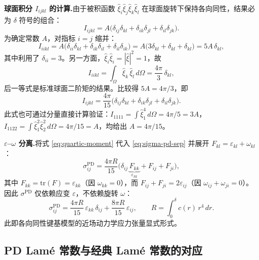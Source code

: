 \textbf{球面积分 $I_{ijkl}$ 的计算.}\quad 由于被积函数 $\hat{\xi}_i\hat{\xi}_j\hat{\xi}_k\hat{\xi}_l$ 在球面旋转下保持各向同性，结果必为 $\delta$ 符号的组合：
\begin{equation}
\label{eq:iso-tensor-form}
I_{ijkl} = A\bigl(\delta_{ij}\delta_{kl}+\delta_{ik}\delta_{jl}+\delta_{il}\delta_{jk}\bigr).
\end{equation}
为确定常数 $A$，对指标 $i=j$ 缩并：
\begin{equation}
\label{eq:contraction}
I_{iikl} = A\bigl(\delta_{ii}\delta_{kl}+\delta_{ik}\delta_{il}+\delta_{il}\delta_{ik}\bigr) = A\bigl(3\delta_{kl}+\delta_{kl}+\delta_{kl}\bigr) = 5A\,\delta_{kl},
\end{equation}
其中利用了 $\delta_{ii}=3$。另一方面，$\hat{\xi}_i\hat{\xi}_i=|\hat{\xi}|^2=1$，故
\begin{equation}
\label{eq:contraction-direct}
I_{iikl} = \int_\Omega \hat{\xi}_k\,\hat{\xi}_l\,d\Omega = \frac{4\pi}{3}\,\delta_{kl},
\end{equation}
后一等式是标准球面二阶矩的结果。比较得 $5A=4\pi/3$，即
\begin{equation}
\label{eq:quartic-moment}
\boxed{I_{ijkl} = \frac{4\pi}{15}\bigl(\delta_{ij}\delta_{kl}+\delta_{ik}\delta_{jl}+\delta_{il}\delta_{jk}\bigr).}
\end{equation}
此式也可通过分量直接计算验证：$I_{1111}=\int\hat{\xi}_1^4\,d\Omega=4\pi/5=3A$，$I_{1122}=\int\hat{\xi}_1^2\hat{\xi}_2^2\,d\Omega=4\pi/15=A$，均给出 $A=4\pi/15$。

\textbf{$\varepsilon$--$\omega$ 分离.}\quad 将式 \eqref{eq:quartic-moment} 代入 \eqref{eq:sigma-pd-sep} 并展开 $F_{kl}=\varepsilon_{kl}+\omega_{kl}$：
\begin{equation}
\label{eq:sigma-pd-expand}
\sigma^{\mathrm{PD}}_{ij} = \frac{4\pi R}{15}\bigl(\delta_{ij}\,\underbrace{F_{kk}}_{\varepsilon_{kk}} + F_{ij} + F_{ji}\bigr),
\end{equation}
其中 $F_{kk}=\mathrm{tr}(F)=\varepsilon_{kk}$（因 $\omega_{kk}=0$），而 $F_{ij}+F_{ji}=2\varepsilon_{ij}$（因 $\omega_{ij}+\omega_{ji}=0$）。因此 $\sigma^{\mathrm{PD}}$ 仅依赖应变 $\varepsilon$，不依赖旋转 $\omega$：
\begin{equation}
\label{eq:sigma-pd-explicit}
\boxed{\sigma^{\mathrm{PD}}_{ij} = \frac{4\pi R}{15}\,\varepsilon_{kk}\,\delta_{ij} + \frac{8\pi R}{15}\,\varepsilon_{ij},\qquad R=\int_0^\delta c(r)\,r^4\,dr.}
\end{equation}
此即各向同性键基模型的近场动力学应力张量显式形式。

\subsection{PD Lam\'e 常数与经典 Lam\'e 常数的对应}
\label{subsec:lame-correspondence}

